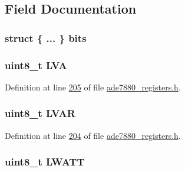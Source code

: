 \subsection{Field Documentation}
\hypertarget{a00026_a753445562408b90f150f83de3717efba}{
\subsubsection[{bits}]{\setlength{\rightskip}{0pt plus 5cm}struct \{ ... \}  bits}}\label{d6/d5b/a00026_a753445562408b90f150f83de3717efba}
\hypertarget{a00026_ab9fef0df339af123203f0a602bbaad41}{
\subsubsection[{L\-V\-A}]{\setlength{\rightskip}{0pt plus 5cm}uint8\-\_\-t L\-V\-A}}\label{d6/d5b/a00026_ab9fef0df339af123203f0a602bbaad41}


Definition at line \hyperlink{a00036_source_l00205}{205} of file \hyperlink{a00036_source}{ade7880\-\_\-registers.\-h}.

\hypertarget{a00026_a78593164042985c43c70910702645036}{
\subsubsection[{L\-V\-A\-R}]{\setlength{\rightskip}{0pt plus 5cm}uint8\-\_\-t L\-V\-A\-R}}\label{d6/d5b/a00026_a78593164042985c43c70910702645036}


Definition at line \hyperlink{a00036_source_l00204}{204} of file \hyperlink{a00036_source}{ade7880\-\_\-registers.\-h}.

\hypertarget{a00026_a70f9611c0de26d5286538fefacdbc496}{
\subsubsection[{L\-W\-A\-T\-T}]{\setlength{\rightskip}{0pt plus 5cm}uint8\-\_\-t L\-W\-A\-T\-T}}\label{d6/d5b/a00026_a70f9611c0de26d5286538fefacdbc496}


